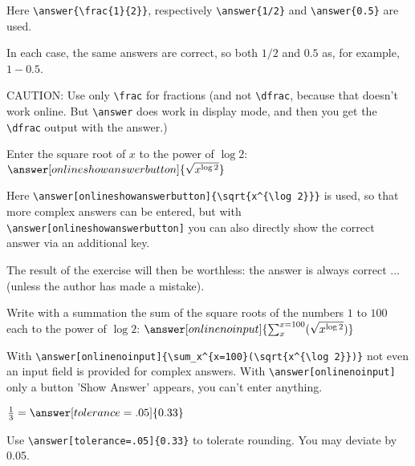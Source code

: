 \documentclass{ximera}
\begin{document}
\begin{exercise}
\begin{question}
         Here \verb|\answer{\frac{1}{2}}|,  respectively \verb|\answer{1/2}| and \verb|\answer{0.5}| are used.
         \begin{hint}
         In each case, the same answers are correct, so both $1/2$ and $0.5$ as, for example, $1-0.5$.
         \end{hint}
         CAUTION: Use only \verb|\frac| for fractions (and not \verb|\dfrac|, because that doesn't work online. But \verb|\answer| does work in display mode, and then you get the \verb|\dfrac| output with the answer.) 
    \end{question}

    \begin{question}
        Enter the square root of $x$ to the power of $\log 2$:   $\answer[onlineshowanswerbutton]{\sqrt{x^{\log 2}}}$

       Here \verb|\answer[onlineshowanswerbutton]{\sqrt{x^{\log 2}}}| is used, so that more complex answers can be entered, but with \verb|\answer[onlineshowanswerbutton]| you can also directly show the correct answer via an additional key. 

       The result of the exercise will then be worthless: the answer is always correct ... (unless the author has made a mistake).
    \end{question}

	\begin{question}
        Write with a summation the sum of the square roots of the numbers $1$ to $100$ each to the power of $\log 2$: $\answer[onlinenoinput]{\sum_x^{x=100}(\sqrt{x^{\log 2}})}$

        With \verb|\answer[onlinenoinput]{\sum_x^{x=100}(\sqrt{x^{\log 2}})}| not even an input field is provided for complex answers. 
        With \verb|\answer[onlinenoinput]| only a button 'Show Answer' appears, you can't enter anything.

    \end{question}

    \begin{question}
        $\frac{1}{3} =  \answer[tolerance=.05]{0.33}$  

        Use \verb|\answer[tolerance=.05]{0.33}| to tolerate rounding. You may deviate by 0.05.
    \end{question}
\end{exercise}
\end{document}
